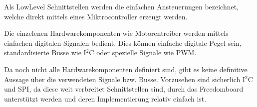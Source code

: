 Als LowLevel Schnittstellen werden die einfachen Ansteuerungen
bezeichnet, welche direkt mittels eines Miktrocontroller erzeugt
werden.

Die einzelenen Hardwarekomponenten wie Motorentreiber werden mittels
einfachen digitalen Signalen bedient. Dies können einfache digitale
Pegel sein, standardisierte Busse wie I$^2$C oder spezielle Signale
wie PWM. 

Da noch nicht alle Hardwarekomponenten definiert sind, gibt es keine
definitive Aussage über die verwendeten Signale bzw. Busse. Vorzusehen
sind sicherlich I$^2$C und SPI, da diese weit verbreitet Schnittstellen
sind, durch das Freedomboard unterstützt werden und deren
Implementierung relativ einfach ist.
